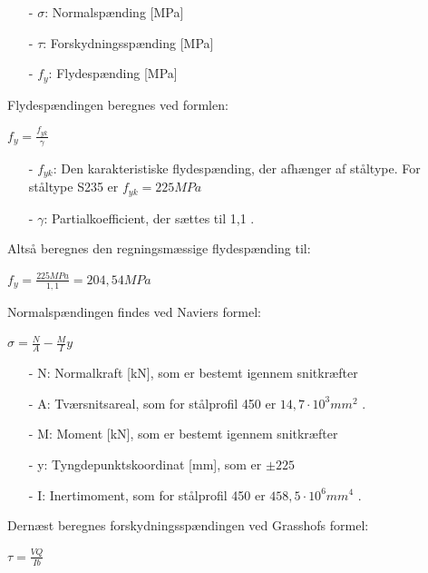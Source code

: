 \begin{itemize}
	\item[-] $\sigma$: Normalspænding [MPa]
	\item[-] $\tau$: Forskydningsspænding [MPa]
	\item[-] $f_y$: Flydespænding [MPa]
\end{itemize}

Flydespændingen beregnes ved formlen:

\begin{center}
	$f_y = \frac{f_{yk}}{\gamma}$
\end{center}

\begin{itemize}
	\item[-] $f_{yk}$: Den karakteristiske flydespænding, der afhænger af ståltype. For ståltype S235 er $f_{yk} = 225 MPa$
	\item[-] $\gamma$: Partialkoefficient, der sættes til 1,1 \citep[ s. 212]{stabi}.  
\end{itemize}

Altså beregnes den regningsmæssige flydespænding til:

\begin{center}
	$f_y = \frac{225 MPa}{1,\!1} = 204,\!54 MPa$
\end{center}

Normalspændingen findes ved Naviers formel:

\begin{center}
	$\sigma = \frac{N}{A} - \frac{M}{I} y$
\end{center}

\begin{itemize}
	\item[-] N: Normalkraft [kN], som er bestemt igennem snitkræfter
	\item[-] A: Tværsnitsareal, som for stålprofil 450 er $14,\!7 \cdot 10^3 mm^2$ \citep{stabi}. 
	\item[-] M: Moment [kN], som er bestemt igennem snitkræfter
	\item[-] y: Tyngdepunktskoordinat [mm], som er $\pm 225$
	\item[-] I: Inertimoment, som for stålprofil 450 er $458,\!5 \cdot 10^6 mm^4$ \citep{stabi}. 
\end{itemize} 

Dernæst beregnes forskydningsspændingen ved Grasshofs formel:

\begin{center}
	$\tau = \frac{VQ}{Ib}$
\end{center}

